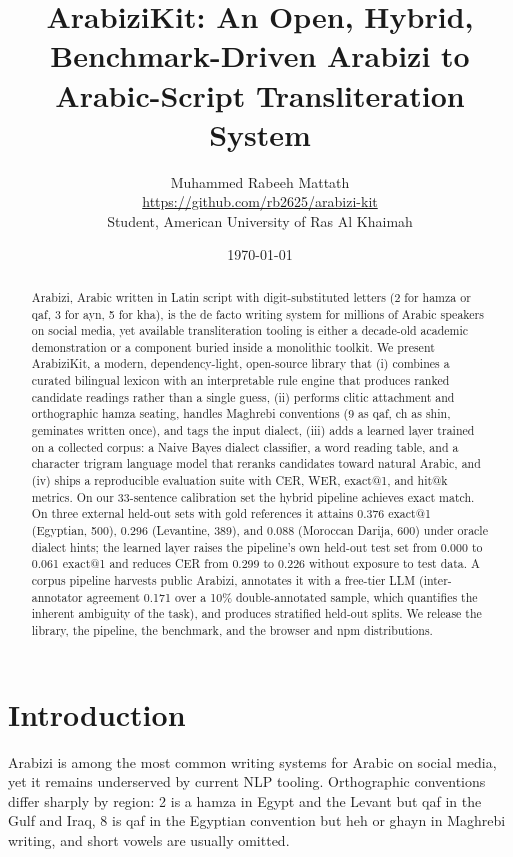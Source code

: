 \documentclass[11pt]{article}
\title{ArabiziKit: An Open, Hybrid, Benchmark-Driven Arabizi to Arabic-Script Transliteration System}
\author{Muhammed Rabeeh Mattath\\
  \small\url{https://github.com/rb2625/arabizi-kit}\\
  \small Student, American University of Ras Al Khaimah}
\date{\today}
\begin{document}
\maketitle

\begin{abstract}
Arabizi, Arabic written in Latin script with digit-substituted letters
(2 for hamza or qaf, 3 for ayn, 5 for kha), is the de facto writing
system for millions of Arabic speakers on social media, yet available
transliteration tooling is either a decade-old academic demonstration or
a component buried inside a monolithic toolkit. We present ArabiziKit, a
modern, dependency-light, open-source library that (i) combines a curated
bilingual lexicon with an interpretable rule engine that produces ranked
candidate readings rather than a single guess, (ii) performs clitic
attachment and orthographic hamza seating, handles Maghrebi conventions
(9 as qaf, ch as shin, geminates written once), and tags the input
dialect, (iii) adds a learned layer trained on a collected corpus: a
Naive Bayes dialect classifier, a word reading table, and a character
trigram language model that reranks candidates toward natural Arabic, and
(iv) ships a reproducible evaluation suite with CER, WER, exact@1, and
hit@k metrics. On our 33-sentence calibration set the hybrid pipeline
achieves exact match. On three external held-out sets with gold
references it attains 0.376 exact@1 (Egyptian, 500), 0.296
(Levantine, 389), and 0.088 (Moroccan Darija, 600) under oracle dialect
hints; the learned layer raises the pipeline's own held-out test set from
0.000 to 0.061 exact@1 and reduces CER from 0.299 to 0.226 without
exposure to test data. A corpus pipeline harvests public Arabizi,
annotates it with a free-tier LLM (inter-annotator agreement 0.171 over a
10\% double-annotated sample, which quantifies the inherent ambiguity of
the task), and produces stratified held-out splits. We release the
library, the pipeline, the benchmark, and the browser and npm
distributions.
\end{abstract}

\section{Introduction}
\label{sec:intro}

Arabizi is among the most common writing systems for Arabic on social
media, yet it remains underserved by current NLP tooling. Orthographic
conventions differ sharply by region: 2 is a hamza in Egypt and the
Levant but qaf in the Gulf and Iraq, 8 is qaf in the Egyptian convention
but heh or ghayn in Maghrebi writing, and short vowels are usually
omitted.
\end{document}
